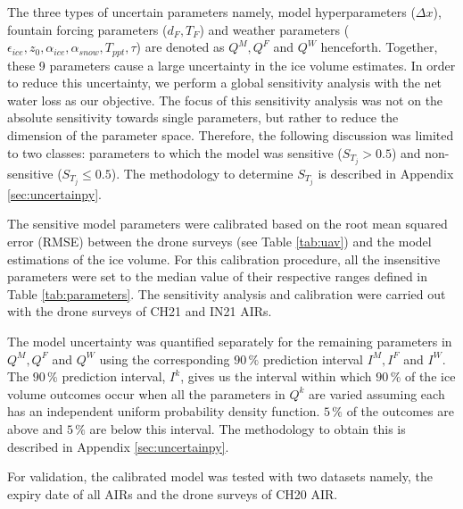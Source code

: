 \documentclass[utf8]{frontiersSCNS}
\begin{document}
The three types of uncertain parameters namely, model hyperparameters ($\Delta x$), fountain forcing parameters
($d_F, T_F$) and weather parameters ($\epsilon_{ice}, z_0, \alpha_{ice}, \alpha_{snow}, T_{ppt}, \tau$) are
denoted as $Q^M, Q^F$ and $Q^W$ henceforth. Together, these 9 parameters cause a large uncertainty in the ice
volume estimates. In order to reduce this uncertainty, we perform a global sensitivity analysis with the net
water loss as our objective. The focus of this sensitivity analysis was not on the absolute sensitivity towards
single parameters, but rather to reduce the dimension of the parameter space. Therefore, the following
discussion was limited to two classes: parameters to which the model was sensitive ($S_{T_{j}} > 0.5$) and
non-sensitive ($S_{T_{j}} \leq 0.5$). The methodology to determine $S_{T_{j}}$ is described in Appendix
\ref{sec:uncertainpy}.

The sensitive model parameters were calibrated based on the root mean squared error (RMSE) between the
drone surveys (see Table \ref{tab:uav}) and the model estimations of the ice volume. For this calibration
procedure, all the insensitive parameters were set to the median value of their respective ranges defined in
Table \ref{tab:parameters}.  The sensitivity analysis and calibration were carried out with the drone surveys of CH21
and IN21 AIRs. 

The model uncertainty was quantified separately for the remaining parameters in $Q^M, Q^F$ and $Q^W$ using the
corresponding $90\, \%$ prediction interval $I^M, I^F$ and $I^W$. The $90\, \%$ prediction interval, $I^k$, gives us the
interval within which $90\,\%$ of the ice volume outcomes occur when all the parameters in $Q^k$ are varied
assuming each has an independent uniform probability density function. $5\,\%$ of the outcomes are above and
$5\,\%$ are below this interval. The methodology to obtain this is described in Appendix \ref{sec:uncertainpy}.

For validation, the calibrated model was tested with two datasets namely, the expiry date of all AIRs and the
drone surveys of CH20 AIR.
\end{document}
